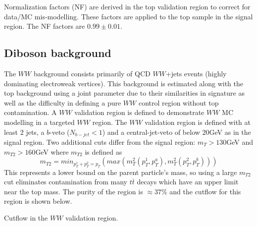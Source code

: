 Normalization factors (NF) are derived in the top validation region to correct for data/MC mis-modelling. These factors are applied to the top sample in the signal region. The NF factors are $0.99\pm0.01$. 

\subsection{Diboson background}

The $WW$ background consists primarily of QCD $WW$+jets events (highly dominating electroweak vertices). This background is estimated along with the top background using a joint parameter due to their similarities in signature as well as the difficulty in defining a pure $WW$ control region without top contamination. A $WW$ validation region is defined to demonstrate $WW$ MC modelling in a targeted $WW$ region.  The $WW$ validation region is defined with at least 2 jets, a $b$-veto ($N_{b-jet}<1$) and a central-jet-veto of below $20$GeV as in the signal region. Two additional cuts differ from the signal region: $m_T>130$GeV and $m_{T2}>160$GeV where $m_{T2}$ is defined as
\begin{equation}
m_{T2}=min_{p_T^1+p_T^2=p_T}(max(m_T^2(p_T^1,p_T^a),m_T^2(p_T^2,p_T^b)))
\end{equation}
This represents a lower bound on the parent particle's mass, so using a large $m_{T2}$ cut eliminates contamination from many $t\bar{t}$ decays which have an upper limit near the top mass. The purity of the region is $\approx 37\%$ and the cutflow for this region is shown below.

\begin{table}[h!]
\scalebox{0.35}{

}
\caption{Cutflow in the $WW$ validation region.}
\label{tab:wwvr}
\end{table}

